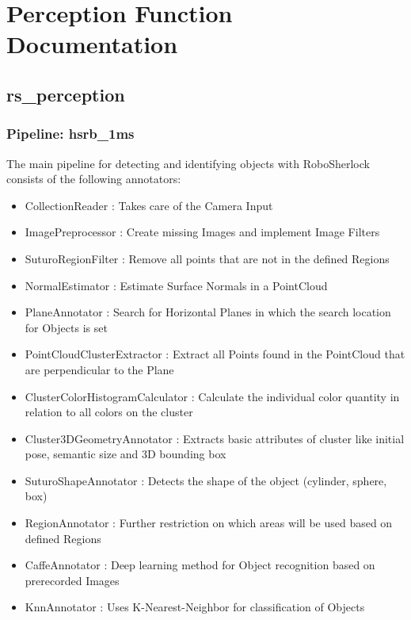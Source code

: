\documentclass[main.tex]{subfiles}
\begin{document}
\begingroup

\renewcommand{\cleardoublepage}{}

\renewcommand{\clearpage}{}

\chapter{Perception Function Documentation}


		\section{rs\_perception}
			\subsection{Pipeline: hsrb\_1ms}

The main pipeline for detecting and identifying objects with RoboSherlock consists of the following annotators:  
\begin{itemize}
	\item CollectionReader : Takes care of the Camera  Input
	\item ImagePreprocessor : Create missing Images and implement Image Filters  
	\item SuturoRegionFilter : Remove all points that are not in the defined Regions 
	\item NormalEstimator : Estimate Surface Normals in a PointCloud 
	\item PlaneAnnotator : Search for Horizontal Planes in which the search location for Objects is set
	\item PointCloudClusterExtractor : Extract all Points found in the PointCloud that are perpendicular to the Plane 
	\item ClusterColorHistogramCalculator : Calculate the individual color quantity in relation to all colors on the cluster   
	\item Cluster3DGeometryAnnotator : Extracts basic attributes of cluster like initial pose, semantic size and 3D bounding box 
	\item SuturoShapeAnnotator : Detects the shape of the object (cylinder, sphere, box)
	\item RegionAnnotator : Further restriction on which areas will be used based on defined Regions 
	\item CaffeAnnotator : Deep learning method for Object recognition based on prerecorded Images 
	\item KnnAnnotator : Uses K-Nearest-Neighbor for classification of Objects 
\end{itemize}
\end{document}
